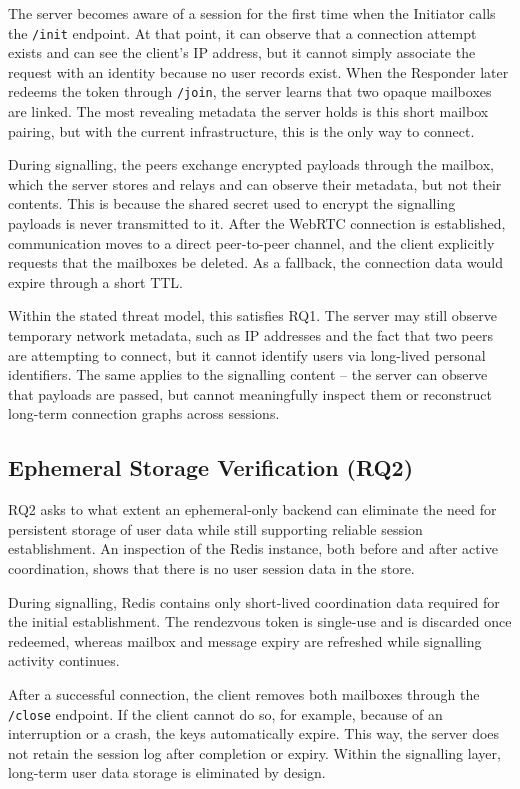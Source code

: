 \documentclass[12pt,a4paper,oneside]{report}
\begin{document}
The server becomes aware of a session for the first time when the Initiator calls the \texttt{/init} endpoint. At that point, it can observe that a connection attempt exists and can see the client's IP address, but it cannot simply associate the request with an identity because no user records exist. When the Responder later redeems the token through \texttt{/join}, the server learns that two opaque mailboxes are linked. The most revealing metadata the server holds is this short mailbox pairing, but with the current infrastructure, this is the only way to connect.

During signalling, the peers exchange encrypted payloads through the mailbox, which the server stores and relays and can observe their metadata, but not their contents. This is because the shared secret used to encrypt the signalling payloads is never transmitted to it. After the WebRTC connection is established, communication moves to a direct peer-to-peer channel, and the client explicitly requests that the mailboxes be deleted. As a fallback, the connection data would expire through a short TTL.

Within the stated threat model, this satisfies RQ1. The server may still observe temporary network metadata, such as IP addresses and the fact that two peers are attempting to connect, but it cannot identify users via long-lived personal identifiers. The same applies to the signalling content -- the server can observe that payloads are passed, but cannot meaningfully inspect them or reconstruct long-term connection graphs across sessions.


\subsection{Ephemeral Storage Verification (RQ2)}
\label{sec:rq2}

RQ2 asks to what extent an ephemeral-only backend can eliminate the need for persistent storage of user data while still supporting reliable session establishment. An inspection of the Redis instance, both before and after active coordination, shows that there is no user session data in the store.

During signalling, Redis contains only short-lived coordination data required for the initial establishment. The rendezvous token is single-use and is discarded once redeemed, whereas mailbox and message expiry are refreshed while signalling activity continues.

After a successful connection, the client removes both mailboxes through the \texttt{/close} endpoint. If the client cannot do so, for example, because of an interruption or a crash, the keys automatically expire. This way, the server does not retain the session log after completion or expiry. Within the signalling layer, long-term user data storage is eliminated by design.
\end{document}
